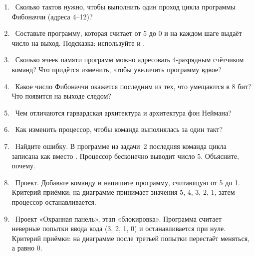 \begin{taskbox}
\begin{enumerate}
  \item {}~Сколько тактов нужно, чтобы выполнить один проход цикла программы
        Фибоначчи (адреса 4--12)?
  \item {}~Составьте программу, которая считает от 5 до 0 и на каждом шаге
        выдаёт число на выход. Подсказка: используйте  и .
  \item {}~Сколько ячеек памяти программ можно адресовать 4-разрядным счётчиком
        команд? Что придётся изменить, чтобы увеличить программу вдвое?
  \item {}~Какое число Фибоначчи окажется последним из тех, что умещаются в 8 бит?
        Что появится на выходе следом?
  \item {}~Чем отличаются гарвардская архитектура и архитектура фон Неймана?
  \item {}~Как изменить процессор, чтобы команда выполнялась за один такт?
  \item {}~Найдите ошибку. В программе из задачи~2 последняя команда цикла записана как
         вместо . Процессор бесконечно выводит число 5. Объясните, почему.
  \item {}~Проект. Добавьте команду  и напишите программу, считающую от 5 до 1.
        Критерий приёмки: на диаграмме  принимает значения 5, 4, 3, 2, 1, затем процессор останавливается.
  \item {}~Проект «Охранная панель», этап «блокировка». Программа считает неверные попытки ввода
        кода (3, 2, 1, 0) и останавливается при нуле. Критерий приёмки: на диаграмме после третьей
        попытки  перестаёт меняться, а  равно 0.
\end{enumerate}
\end{taskbox}
